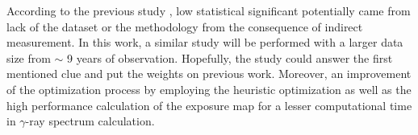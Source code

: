 According to the previous study \citep{FermiEarth14}, 
low statistical significant potentially came from lack of the 
dataset or the methodology from the consequence of indirect
measurement. In this work, a similar study will be performed with 
a larger data size from $\sim$ 9 years of observation. Hopefully, 
the study could answer the first mentioned clue and put the weights
on previous work. Moreover, an improvement of the optimization
process by employing the heuristic optimization as well as the
high performance calculation of the exposure map for a lesser
computational time in $\gamma$-ray spectrum calculation. 
